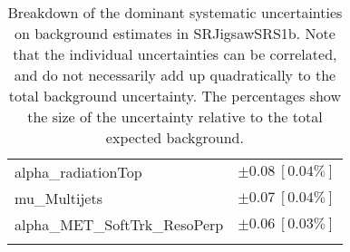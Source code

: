 \begin{table}
\begin{center}
\begin{tabular*}{\textwidth}{@{\extracolsep{\fill}}lc}
alpha\_radiationTop         & $\pm 0.08\ [0.04\%] $       \\
mu\_Multijets         & $\pm 0.07\ [0.04\%] $       \\
alpha\_MET\_SoftTrk\_ResoPerp         & $\pm 0.06\ [0.03\%] $       \\
\noalign{\smallskip}\hline\noalign{\smallskip}
\end{tabular*}
\end{center}
\caption[Breakdown of uncertainty on background estimates]{
Breakdown of the dominant systematic uncertainties on background estimates in SRJigsawSRS1b.
Note that the individual uncertainties can be correlated, and do not necessarily add up quadratically to 
the total background uncertainty. The percentages show the size of the uncertainty relative to the total expected background.
\label{table.results.bkgestimate.uncertainties.SRJigsawSRS1b}}
\end{table}
%